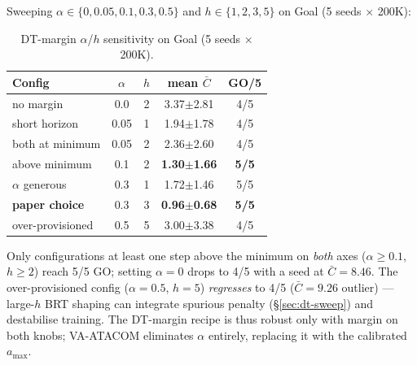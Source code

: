 \documentclass[letterpaper]{article}
\begin{document}
Sweeping $\alpha \in \{0, 0.05, 0.1, 0.3, 0.5\}$ and $h \in \{1, 2, 3, 5\}$ on Goal (5 seeds $\times$ 200K):

\begin{table}[t]
\centering
\caption{DT-margin $\alpha$/$h$ sensitivity on Goal (5 seeds $\times$ 200K).}
\label{tab:alpha-h}
\begin{tabular}{lcccc}
\toprule
Config & $\alpha$ & $h$ & mean $\bar C$ & GO/5 \\
\midrule
no margin            & 0.0  & 2 & 3.37$\pm$2.81 & 4/5 \\
short horizon        & 0.05 & 1 & 1.94$\pm$1.78 & 4/5 \\
both at minimum      & 0.05 & 2 & 2.36$\pm$2.60 & 4/5 \\
above minimum        & 0.1  & 2 & \textbf{1.30$\pm$1.66} & \textbf{5/5} \\
$\alpha$ generous    & 0.3  & 1 & 1.72$\pm$1.46 & 5/5 \\
\textbf{paper choice}& 0.3  & 3 & \textbf{0.96$\pm$0.68} & \textbf{5/5} \\
over-provisioned     & 0.5  & 5 & 3.00$\pm$3.38 & 4/5 \\
\bottomrule
\end{tabular}
\end{table}

Only configurations at least one step above the minimum on \emph{both} axes ($\alpha{\ge}0.1$, $h{\ge}2$) reach 5/5 GO; setting $\alpha{=}0$ drops to 4/5 with a seed at $\bar C{=}8.46$. The over-provisioned config ($\alpha{=}0.5$, $h{=}5$) \emph{regresses} to 4/5 ($\bar C{=}9.26$ outlier) --- large-$h$ BRT shaping can integrate spurious penalty (\S\ref{sec:dt-sweep}) and destabilise training. The DT-margin recipe is thus robust only with margin on both knobs; VA-ATACOM eliminates $\alpha$ entirely, replacing it with the calibrated $a_{\max}$.



\end{document}
